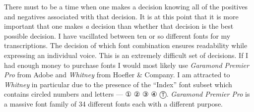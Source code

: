 \documentclass[nofonts,nobib]{tufte-handout}
\begin{document}
There must to be a time when one makes a decision knowing all of the positives and negatives associated with that decision. It is at this point that it is more important that one makes \emph{a} decision than whether that decision is the best possible decision. I have vacillated between ten or so different fonts for my transcriptions. The decision of which font combination ensures readability while expressing an individual voice. This is an extremely difficult set of decisions. If I had enough money to purchase fonts I would most likely use \emph{Garamond Premier Pro} from Adobe and \emph{Whitney} from Hoefler \& Company.\autocites{garamondPremier,hoeflerWhitney} I am attracted to \emph{Whitney} in particular due to the presence of the ``Index'' font subset which contains circled numbers and letters --- {\symbolfont① ② ③ ④ Ⓣ}. \emph{Garamond Premier Pro} is a massive font family of 34 different fonts each with a different purpose.

\nocite{adamRafferty}
\nocite{alexAnderson}
\nocite{alexDeGrassi}
\nocite{andrewWhite}
\nocite{andyMcKee}
\nocite{billyMcLaughlin}
\nocite{calumGraham,cliveCarroll,craigDAndrea,evaAtmatzidou,ewanDobson,garethPearson,happyTraum,ianEthanCase,janetFeder,jimmyWahlsteen,jonGomm,kakiKing,kellyValleau,kevinHorrigan,leoKottke,lucaStricagnoli,lucasMich,masaakiKishibe,michaelChap,michaelGul,mikeDawes,murielAnders,peppino,peterCiluzzi,peterFinger,pierre,rayMontford,pino,spencerElliot,sunghaJung,thomasLeeb,timSparks,tommyEmmanuel,trevorGH,vickiGenfan}
% 
% 
\printbibliography
\end{document}
